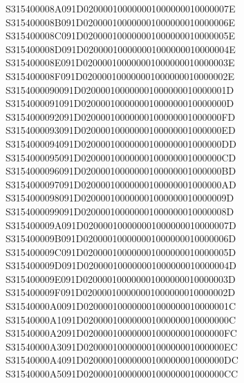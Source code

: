 \documentclass[12pt,a4paper]{article}
\begin{document}
\begin{framed}
{S315400008A091D020000100000001000000010000007E\newline
S315400008B091D020000100000001000000010000006E\newline
S315400008C091D020000100000001000000010000005E\newline
S315400008D091D020000100000001000000010000004E\newline
S315400008E091D020000100000001000000010000003E\newline
S315400008F091D020000100000001000000010000002E\newline
S3154000090091D020000100000001000000010000001D\newline
S3154000091091D020000100000001000000010000000D\newline
S3154000092091D02000010000000100000001000000FD\newline
S3154000093091D02000010000000100000001000000ED\newline
S3154000094091D02000010000000100000001000000DD\newline
S3154000095091D02000010000000100000001000000CD\newline
S3154000096091D02000010000000100000001000000BD\newline
S3154000097091D02000010000000100000001000000AD\newline
S3154000098091D020000100000001000000010000009D\newline
S3154000099091D020000100000001000000010000008D\newline
S315400009A091D020000100000001000000010000007D\newline
S315400009B091D020000100000001000000010000006D\newline
S315400009C091D020000100000001000000010000005D\newline
S315400009D091D020000100000001000000010000004D\newline
S315400009E091D020000100000001000000010000003D\newline
S315400009F091D020000100000001000000010000002D\newline
S31540000A0091D020000100000001000000010000001C\newline
S31540000A1091D020000100000001000000010000000C\newline
S31540000A2091D02000010000000100000001000000FC\newline
S31540000A3091D02000010000000100000001000000EC\newline
S31540000A4091D02000010000000100000001000000DC\newline
S31540000A5091D02000010000000100000001000000CC\newline
}
\end{framed}
\end{document}
